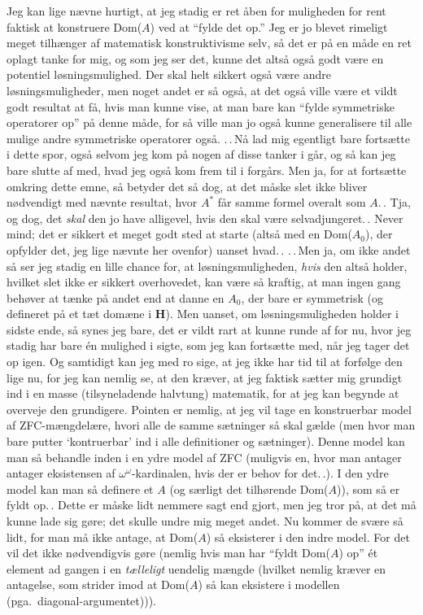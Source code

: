 \documentclass{report}
\begin{document}
Jeg kan lige nævne hurtigt, at jeg stadig er ret åben for muligheden for rent faktisk at konstruere Dom($A$) ved at ``fylde det op.'' Jeg er jo blevet rimeligt meget tilhænger af matematisk konstruktivisme selv, så det er på en måde en ret oplagt tanke for mig, og som jeg ser det, kunne det altså også godt være en potentiel løsningsmulighed. Der skal helt sikkert også være andre løsningsmuligheder, men noget andet er så også, at det også ville være et vildt godt resultat at få, hvis man kunne vise, at man bare kan ``fylde symmetriske operatorer op'' på denne måde, for så ville man jo også kunne generalisere til alle mulige andre symmetriske operatorer også. .\,.\,Nå lad mig egentligt bare fortsætte i dette spor, også selvom jeg kom på nogen af disse tanker i går, og så kan jeg bare slutte af med, hvad jeg også kom frem til i forgårs. Men ja, for at fortsætte omkring dette emne, så betyder det så dog, at det måske slet ikke bliver nødvendigt med nævnte resultat, hvor $A^*$ får samme formel overalt som $A$.\,. Tja, og dog, det \emph{skal} den jo have alligevel, hvis den skal være selvadjungeret.\,. Never mind; det er sikkert et meget godt sted at starte (altså med en Dom($A_0$), der opfylder det, jeg lige nævnte her ovenfor) uanset hvad.\,. .\,.\,Men ja, om ikke andet så ser jeg stadig en lille chance for, at løsningsmuligheden, \emph{hvis} den altså holder, hvilket slet ikke er sikkert overhovedet, kan være så kraftig, at man ingen gang behøver at tænke på andet end at danne en $A_0$, der bare er symmetrisk (og defineret på et tæt domæne i \textbf{H}). Men uanset, om løsningsmuligheden holder i sidste ende, så synes jeg bare, det er vildt rart at kunne runde af for nu, hvor jeg stadig har bare én mulighed i sigte, som jeg kan fortsætte med, når jeg tager det op igen. Og samtidigt kan jeg med ro sige, at jeg ikke har tid til at forfølge den lige nu, for jeg kan nemlig se, at den kræver, at jeg faktisk sætter mig grundigt ind i en masse (tilsyneladende halvtung) matematik, for at jeg kan begynde at overveje den grundigere. Pointen er nemlig, at jeg vil tage en konstruerbar model af ZFC-mængdelære, hvori alle de samme sætninger så skal gælde (men hvor man bare putter `kontruerbar' ind i alle definitioner og sætninger). Denne model kan man så behandle inden i en ydre model af ZFC (muligvis en, hvor man antager antager eksistensen af $\omega^\omega$-kardinalen, hvis der er behov for det.\,.). I den ydre model kan man så definere et $A$ (og særligt det tilhørende Dom($A$)), som så er fyldt op.\,. Dette er måske lidt nemmere sagt end gjort, men jeg tror på, at det må kunne lade sig gøre; det skulle undre mig meget andet. Nu kommer de svære så lidt, for man må ikke antage, at Dom($A$) så eksisterer i den indre model. For det vil det ikke nødvendigvis gøre (nemlig hvis man har ``fyldt Dom($A$) op'' ét element ad gangen i en \emph{tælleligt} uendelig mængde (hvilket nemlig kræver en antagelse, som strider imod at Dom($A$) så kan eksistere i modellen (pga.\ diagonal-argumentet))). 
\end{document}
